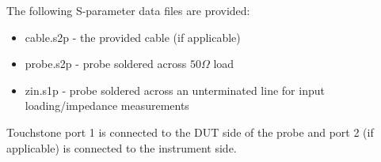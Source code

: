 \documentclass[11pt]{article}
\begin{document}
The following S-parameter data files are provided:
\begin{itemize}
\item cable.s2p - the provided cable (if applicable)
\item probe.s2p - probe soldered across $50 \Omega$ load
\item zin.s1p - probe soldered across an unterminated line for input loading/impedance measurements
\end{itemize}

Touchstone port 1 is connected to the DUT side of the probe and port 2 (if applicable) is connected to the instrument
side.
\end{document}
